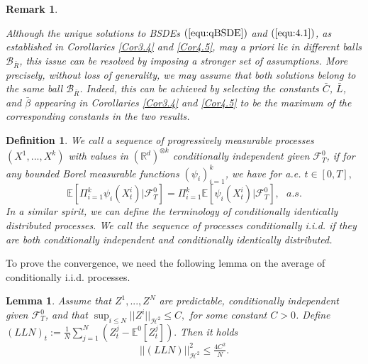 \documentclass[10pt,a4paper]{article}
\newcommand{\R}{\mathbb{R}}
\newcommand{\E}{\mathbb{E}}
\newcommand{\be}{\begin{equation}}
\newcommand{\ee}{\end{equation}}
\newcommand{\MF}{{\mathcal{F}}}
\newcommand{\MH}{{\mathcal{H}}}
\theoremstyle{plain}
\newtheorem{Lemma}[Theorem]{Lemma}
\newtheorem{Remark}[Theorem]{Remark}
\newtheorem{Definition}[Theorem]{Definition}
\theoremstyle{definition}
\numberwithin{equation}{section}
\begin{document}
\begin{Remark}
\label{Rem5.1}

Although the unique solutions to BSDEs \((\ref{equ:qBSDE})\) and \((\ref{equ:4.1})\), as established in Corollaries \ref{Cor3.4} and \ref{Cor4.5}, may \emph{a priori} lie in different balls \(\mathcal{B}_{\bar{R}}\), this issue can be resolved by imposing a stronger set of assumptions. More precisely, without loss of generality, we may assume that both solutions belong to the same ball \(\mathcal{B}_{\bar{R}}\). Indeed, this can be achieved by selecting the constants \(\bar{C}\), \(\bar{L}\), and \(\bar{\beta}\) appearing in Corollaries \ref{Cor3.4} and \ref{Cor4.5} to be the maximum of the corresponding constants in the two results.

\end{Remark}

\begin{Definition}
    We call a sequence of progressively measurable processes $(X^1,...,X^k)$ with values in $(\R^d)^{\otimes k}$ conditionally independent given $\MF_T^0$, if for any bounded Borel measurable functions $(\psi_i)_{i=1}^k$, we have for a.e. $t\in [0,T],$
\be\label{eq:cind}
\E[ \Pi_{i=1}^k \psi_i(X^i_t) |\MF_T^0] = \Pi_{i=1}^k \E[\psi_i(X^i_t) |\MF_T^0 ],\ \ \ a.s.
\ee
In a similar spirit, we can define the terminology of conditionally identically distributed processes. We call the sequence of processes conditionally i.i.d. if they are both conditionally independent and conditionally identically distributed. 
    
\end{Definition}




To prove the convergence, we need the following lemma on the average of conditionally i.i.d. processes.


\begin{Lemma}\label{Lemma5.2}
Assume that $  Z^{1},...,Z^{N} $ are predictable, 
% 
conditionally independent given $\mathcal{F}_{T}^{0}$, and that 
$
\sup_{i \leq N} ||Z^{i}||_{\MH^{2}} \leq C,
$ for some constant $C>0$. Define
$
(LLN)_{t} := \tfrac{1}{N}\sum_{j=1}^{N}(Z_{t}^{j}-\mathbb{E}^{0}[Z_{t}^{j}]).
$
Then it holds
\[
||(LLN)||_{\mathcal{H}^{2}}^{2} \leq \tfrac{4C^{2}}{N}.
\]
\end{Lemma}
\end{document}
